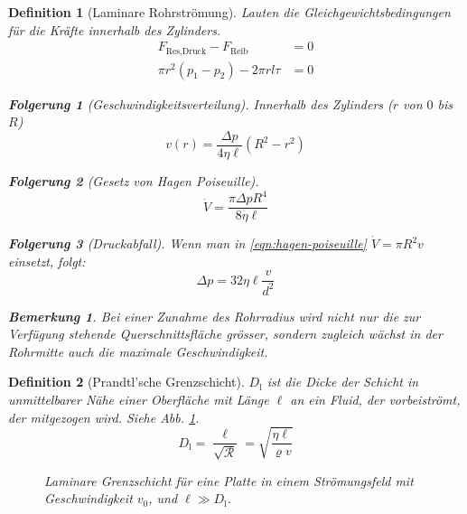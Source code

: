 \documentclass[a4paper, twocolumn]{article}
\numberwithin{equation}{section}
\theoremstyle{hsr-def}
\newtheorem{definition}{Definition}[section]
\theoremstyle{hsr-sub}
\newtheorem{result}{Folgerung}[definition]
\newtheorem{remark}{Bemerkung}[definition]
\begin{document}
\begin{definition}[Laminare Rohrstr\"omung]
Lauten die Gleichgewichtsbedingungen f\"ur die Kr\"afte innerhalb des Zylinders.
\begin{align*}
    F_\text{Res,Druck} - F_\text{Reib} & = 0 \\
    \pi r^2 (p_1 - p_2) - 2\pi rl\tau &= 0
\end{align*}

\begin{result}[Geschwindigkeitsverteilung] 
Innerhalb des Zylinders (\(r\) von \(0\) bis \(R\))
\[
    v(r) = \frac{\Delta p}{4\eta\ell}\left(R^2-r^2\right)
\]
\end{result}

\begin{result}[Gesetz von Hagen Poiseuille]
\begin{equation} \label{eqn:hagen-poiseuille}
    \dot{V} = \frac{\pi\Delta p R^4}{8\eta\ell}
\end{equation}
\end{result}

\begin{result}[Druckabfall]
Wenn man in \eqref{eqn:hagen-poiseuille} \(\dot{V} = \pi R^2 v\) einsetzt, folgt:
\[
    \Delta p = 32\eta\ell \frac{v}{d^2}
\]
\end{result}

\begin{remark}
Bei einer Zunahme des Rohrradius wird nicht nur die zur Verf\"ugung stehende Querschnittsfl\"ache gr\"osser, sondern zugleich w\"achst in der Rohrmitte auch die maximale Geschwindigkeit.
\end{remark}
\end{definition}

\begin{definition}[Prandtl'sche Grenzschicht]
\(D_\text{l}\) ist die Dicke der Schicht in unmittelbarer N\"ahe einer Oberfl\"ache mit L\"ange \(\ell\) an ein Fluid, der vorbeistr\"omt, der mitgezogen wird. Siehe Abb. \ref{fig:prandtl-boundary}.
\[
    D_\text{l} = \frac{\ell}{\sqrt{\mathcal{R}}} =  \sqrt{\frac{\eta\ell}{\varrho v}}
\]
\begin{figure}[h] \centering

\caption{Laminare Grenzschicht f\"ur eine Platte in einem Str\"omungsfeld mit Geschwindigkeit \(v_0\), und \(\ell \gg D_\text{l}\).}
\label{fig:prandtl-boundary}
\end{figure}
\end{definition}
\end{document}
